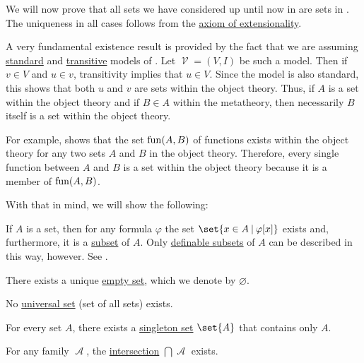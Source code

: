 \begin{proposition}\label{thm:zfc_existence_theorems}
  We will now prove that all sets we have considered up until now in  are sets in \hyperref[def:zfc]{}. The uniqueness in all cases follows from the \hyperref[def:zfc/extensionality]{axiom of extensionality}.

  A very fundamental existence result is provided by the fact that we are assuming \hyperref[rem:standard_model_of_set_theory]{standard} and \hyperref[rem:transitive_model_of_set_theory]{transitive} models of . Let \( \mscrV = (V, I) \) be such a model. Then if \( v \in V \) and \( u \in v \), transitivity implies that \( u \in V \). Since the model is also standard, this shows that both \( u \) and \( v \) are sets within the object theory. Thus, if \( A \) is a set within the object theory and if \( B \in A \) within the metatheory, then necessarily \( B \) itself is a set within the object theory.

  For example,  shows that the set \( \operatorname{fun}(A, B) \) of functions exists within the object theory for any two sets \( A \) and \( B \) in the object theory. Therefore, every single function between \( A \) and \( B \) is a set within the object theory because it is a member of \( \operatorname{fun}(A, B) \).

  With that in mind, we will show the following:

  \begin{thmenum}
     If \( A \) is a set, then for any formula \( \varphi \) the set \( \set{ x \in A \given \varphi[x] } \) exists and, furthermore, it is a \hyperref[def:subset]{subset} of \( A \). Only \hyperref[def:first_order_definability]{definable subsets} of \( A \) can be described in this way, however. See .

     There exists a unique \hyperref[def:empty_set]{empty set}, which we denote by \( \varnothing \).

     No \hyperref[def:set]{universal set} (set of all sets) exists.

     For every set \( A \), there exists a \hyperref[rem:singleton_sets]{singleton set} \( \set{ A } \) that contains only \( A \).

     For any  family \( \mscrA \), the \hyperref[def:basic_set_operations/intersection]{intersection} \( \bigcap \mscrA \) exists.


\end{thmenum}
\end{proposition}
